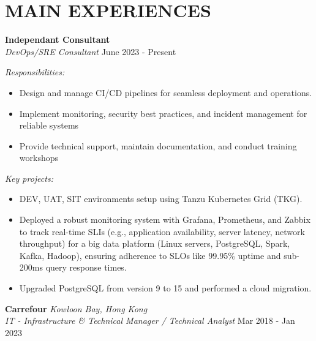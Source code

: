 \documentclass[11pt]{article}
\begin{document}
	\section*{{\fontsize{15}{0}\selectfont M}AIN EXPERIENCES} \vspace{-1em}
	\textbf{Independant Consultant}\\ 
	\textit{DevOps/SRE Consultant} \hfill June 2023 - Present
	
	\textit{Responsibilities:}
	\begin{itemize}
		\item Design and manage CI/CD pipelines for seamless deployment and operations.
		\item Implement monitoring, security best practices, and incident management for reliable systems
		\item Provide technical support, maintain documentation, and conduct training workshops
	\end{itemize}
	
	\textit{Key projects:}
	\begin{itemize} \item DEV, UAT, SIT environments setup using Tanzu Kubernetes Grid (TKG).
		\item Deployed a robust monitoring system with Grafana, Prometheus, and Zabbix to track real-time SLIs (e.g., application availability, server latency, network throughput) for a big data platform (Linux servers, PostgreSQL, Spark, Kafka, Hadoop), ensuring adherence to SLOs like 99.95\% uptime and sub-200ms query response times.
		\item Upgraded PostgreSQL from version 9 to 15 and performed a cloud migration.
	\end{itemize}
	
	\textbf{Carrefour} \hfill \textit{Kowloon Bay, Hong Kong} \\
	\textit{IT - Infrastructure \& Technical Manager / Technical Analyst} \hfill Mar 2018 - Jan 2023
	
\end{document}
